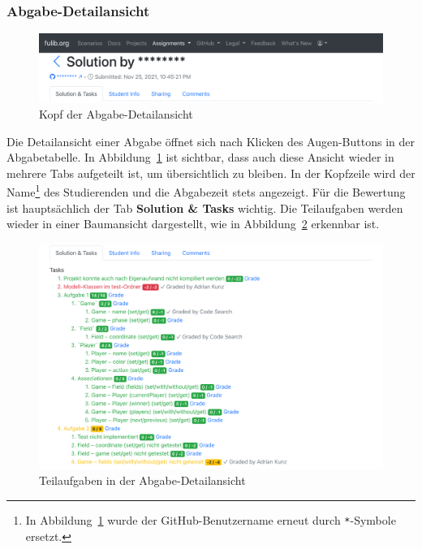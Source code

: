 \subsubsection{Abgabe-Detailansicht}

\begin{figure}
    \centering
    \includegraphics[width=\textwidth]{images/solution-head}
    \caption{Kopf der Abgabe-Detailansicht}
    \label{fig:solution-head}
\end{figure}


Die Detailansicht einer Abgabe öffnet sich nach Klicken des Augen-Buttons in der Abgabetabelle.
In Abbildung~\ref{fig:solution-head} ist sichtbar, dass auch diese Ansicht wieder in mehrere Tabs aufgeteilt ist, um übersichtlich zu bleiben.
In der Kopfzeile wird der Name\footnote{
    In Abbildung~\ref{fig:solution-head} wurde der GitHub-Benutzername erneut durch \texttt{*}-Symbole ersetzt.
} des Studierenden und die Abgabezeit stets angezeigt.
Für die Bewertung ist hauptsächlich der Tab \textbf{Solution \& Tasks} wichtig.
Die Teilaufgaben werden wieder in einer Baumansicht dargestellt, wie in Abbildung~\ref{fig:solution-tasks} erkennbar ist.

\begin{figure}
    \centering
    \includegraphics[width=\textwidth]{images/solution-tasks}
    \caption{Teilaufgaben in der Abgabe-Detailansicht}
    \label{fig:solution-tasks}
\end{figure}

